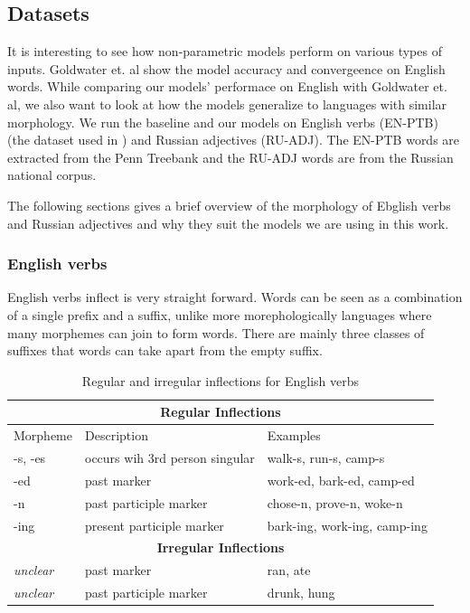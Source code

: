 \subsection{Datasets}

It is interesting to see how non-parametric models perform on various types of
inputs. Goldwater et. al show the model accuracy and convergeence on English
words. While comparing our models' performace on English with Goldwater et. al,
we also want to look at how the models generalize to languages with similar
morphology. We run the baseline and our models on English verbs (EN-PTB) (the
dataset used in \cite{goldwater2011}) and Russian adjectives (RU-ADJ). The
EN-PTB words are extracted from the Penn Treebank and the RU-ADJ words are from
the Russian national corpus.

The following sections gives a brief overview of the morphology of Ebglish
verbs and Russian adjectives and why they suit the models we are using in this
work.  

\subsubsection{English verbs}

English verbs inflect is very straight forward. Words can be seen as a
combination of a single prefix and a suffix, unlike more morephologically
languages where many morphemes can join to form words. There are mainly three
classes of suffixes that words can take apart from the empty suffix.

\begin{table}[h]
\centering
\begin{tabular}{lll}
\hline
\multicolumn{3}{c}{\textbf{Regular Inflections}} \\
\hline
Morpheme & Description & Examples \\
\hline
-s, -es & occurs wih 3rd person singular & walk-s, run-s, camp-s \\
-ed & past marker & work-ed, bark-ed, camp-ed \\
-n & past participle marker & chose-n, prove-n, woke-n \\
-ing & present participle marker & bark-ing, work-ing, camp-ing \\
\hline
\multicolumn{3}{c}{\textbf{Irregular Inflections}} \\
\hline
\textit{unclear} & past marker & ran, ate \\
\textit{unclear} & past participle marker & drunk, hung \\
\hline
\end{tabular}
\caption{\label{enInflections}Regular and irregular inflections for English verbs}
\end{table}



